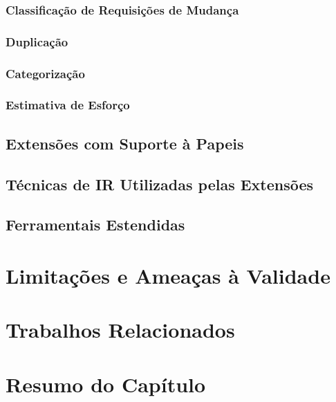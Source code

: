 \subsubsection{Classificação de Requisições de Mudança}
\label{ssub:classificação_de_requisições_de_mudança}

\subsubsection{Duplicação}
\subsubsection{Categorização}
\subsubsection{Estimativa de Esforço}



\subsection{Extensões com Suporte à Papeis}
\label{sub:extensões_com_suporte_à_papeis}


\subsection{Técnicas de IR Utilizadas pelas Extensões}
\label{sub:técnicas_de_ir_utilizadaas_pelas_extensões}


\subsection{Ferramentais Estendidas}
\label{sub:ferrramentas_extendidas}


\section{Limitações e Ameaças à Validade}

\section{Trabalhos Relacionados}

\section{Resumo do Capítulo}